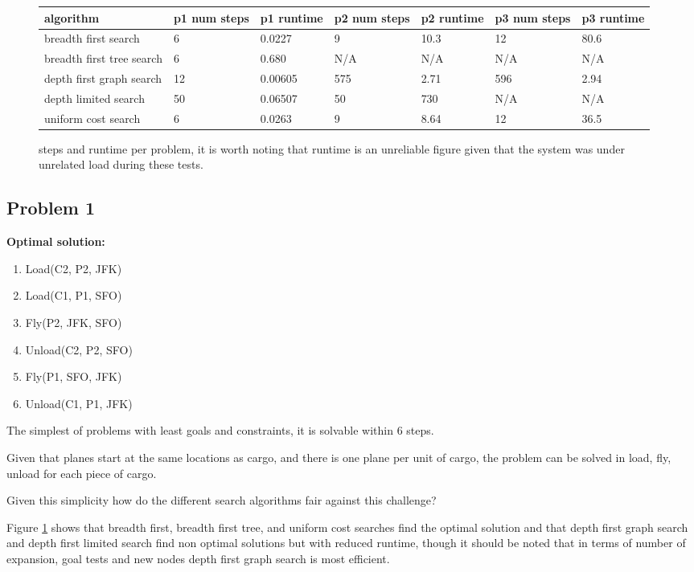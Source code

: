\documentclass[11pt]{article}
\begin{document}
\begin{figure}[H]
	\begin{tabular}{|p{2cm}|| p{1.3cm} p{1.3cm} | p{1.3cm} p{1.3cm} | p{1.3cm} p{1.3cm} |} 
		\hline
		algorithm & p1 num steps & p1 runtime & p2 num steps & p2 runtime & p3 num steps & p3 runtime \\
		\hline
		\hline
		breadth first search & 6 & 0.0227 & 9 & 10.3 & 12 & 80.6  \\
		\hline
		breadth first tree search & 6 & 0.680 & N/A & N/A & N/A & N/A  \\
		\hline
		depth first graph search & 12 & 0.00605 & 575 & 2.71 & 596 & 2.94  \\
		\hline
		depth limited search & 50 & 0.06507 & 50 & 730 & N/A & N/A  \\
		\hline
		uniform cost search & 6 & 0.0263 & 9 & 8.64 & 12 & 36.5  \\
		\hline
	\end{tabular}
	\caption{steps and runtime per problem, it is worth noting that runtime is an unreliable figure given that the system was under unrelated load during these tests.}
	\label{uninformed_results_timestep}
\end{figure}

\subsection{Problem 1}

\textbf{Optimal solution:}
\begin{enumerate}
	\item Load(C2, P2, JFK)
	\item Load(C1, P1, SFO)
	\item Fly(P2, JFK, SFO)
	\item Unload(C2, P2, SFO)
	\item Fly(P1, SFO, JFK)
	\item Unload(C1, P1, JFK)
\end{enumerate}

The simplest of problems with least goals and constraints, it is solvable within 6 steps.

Given that planes start at the same locations as cargo, and there is one plane per unit of cargo, the problem can be solved in load, fly, unload for each piece of cargo.

Given this simplicity how do the different search algorithms fair against this challenge?

Figure \ref{uninformed_results_timestep} shows that breadth first, breadth first tree, and uniform cost searches find the optimal solution and that depth first graph search and depth first limited search find non optimal solutions but with reduced runtime, though it should be noted that in terms of number of expansion, goal tests and new nodes depth first graph search is most efficient. 
\end{document}
